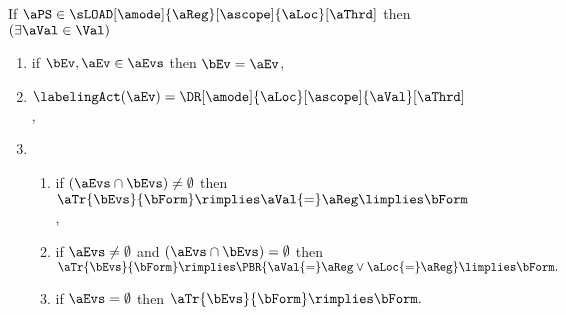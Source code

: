 \begin{figure}
  \noindent
  If $\aPS \in \sLOAD[\amode]{\aReg}[\ascope]{\aLoc}[\aThrd]$ then
  $(\exists\aVal\in\Val)$
  \begin{multicols}{2}
    \begin{enumerate}[topsep=0pt,label=(\textsc{r}\arabic*),ref=\textsc{r}\arabic*]
    \item \label{read-E}
      if $\bEv,\aEv\in\aEvs$ then $\bEv=\aEv$,
    \item \label{read-lambda}
      $\labelingAct(\aEv) = \DR[\amode]{\aLoc}[\ascope]{\aVal}[\aThrd]$,
    \item[] 
      \begin{enumerate}[leftmargin=0pt]
      \item \label{read-tau-dep}
        if $(\aEvs\cap\bEvs)\neq\emptyset$ then
        \begin{math}
          \aTr{\bEvs}{\bForm} \rimplies
          \aVal{=}\aReg
          \limplies \bForm
        \end{math},    
      \item \label{read-tau-ind}
        if $\aEvs\neq\emptyset$ and $(\aEvs\cap\bEvs)=\emptyset$ then
        \begin{math}
          \aTr{\bEvs}{\bForm} \rimplies
          \PBR{\aVal{=}\aReg \lor \aLoc{=}\aReg} \limplies
          \bForm.
        \end{math}
      \item \label{read-tau-empty}
        if $\aEvs=\emptyset$ then
        \begin{math}
          \aTr{\bEvs}{\bForm} \rimplies
          \bForm.
        \end{math}
      \end{enumerate}
    \end{enumerate}
  \end{multicols}
  \medskip


\end{figure}
